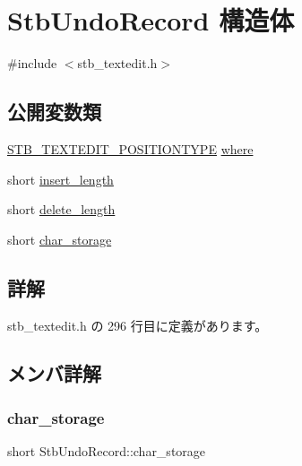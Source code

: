 \hypertarget{struct_stb_undo_record}{}\section{Stb\+Undo\+Record 構造体}
\label{struct_stb_undo_record}


{\ttfamily \#include $<$stb\+\_\+textedit.\+h$>$}

\subsection*{公開変数類}
\begin{DoxyCompactItemize}
\item 
\mbox{\hyperlink{stb__textedit_8h_a5d0c1b8751b6517e3d817f2a025ed654}{S\+T\+B\+\_\+\+T\+E\+X\+T\+E\+D\+I\+T\+\_\+\+P\+O\+S\+I\+T\+I\+O\+N\+T\+Y\+PE}} \mbox{\hyperlink{struct_stb_undo_record_a49e87adbb75a18ffba1f853ac974b31d}{where}}
\item 
short \mbox{\hyperlink{struct_stb_undo_record_ae2a3af79db791549db0c42263407cab5}{insert\+\_\+length}}
\item 
short \mbox{\hyperlink{struct_stb_undo_record_ad81789175cef417a0fe58204277fd735}{delete\+\_\+length}}
\item 
short \mbox{\hyperlink{struct_stb_undo_record_a654ca22cb5021a8ee18ad5f500eb406d}{char\+\_\+storage}}
\end{DoxyCompactItemize}


\subsection{詳解}


 stb\+\_\+textedit.\+h の 296 行目に定義があります。



\subsection{メンバ詳解}
\mbox{\label{struct_stb_undo_record_a654ca22cb5021a8ee18ad5f500eb406d}} 
\subsubsection{\texorpdfstring{char\+\_\+storage}{char\_storage}}
{\footnotesize\ttfamily short Stb\+Undo\+Record\+::char\+\_\+storage}



